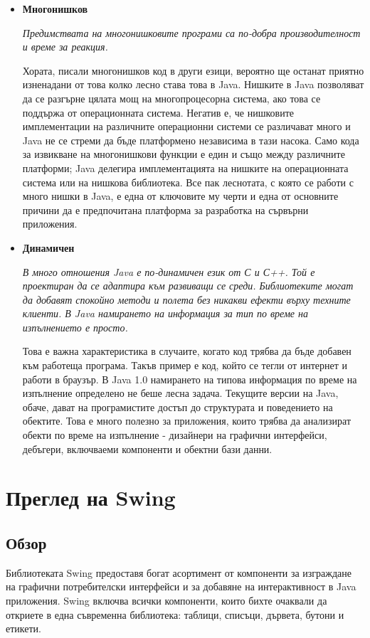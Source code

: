 \begin{itemize}
  \item \textbf{Многонишков}

       \emph{Предимствата на многонишковите програми са по-добра
       производителност и време за реакция.}

       Хората, писали многонишков код в други езици, вероятно ще
       останат приятно изненадани от това колко лесно става това в
       Java. Нишките в Java позволяват да се разгърне цялата мощ на
       многопроцесорна система, ако това се поддържа от операционната
       система. Негатив е, че нишковите имплементации на различните
       операционни системи се различават много и Java не се стреми да
       бъде платформено независима в тази насока. Само кода за
       извикване на многонишкови функции е един и също между
       различните платформи; Java делегира имплементацията на нишките
       на операционната система или на нишкова библиотека. Все пак
       леснотата, с която се работи с много нишки в Java, е една от
       ключовите му черти и една от основните причини да е
       предпочитана платформа за разработка на сървърни приложения.


  \item \textbf{Динамичен}

    \emph{В много отношения Java е по-динамичен език от С и С++. Той е
    проектиран да се адаптира към развиващи се среди. Библиотеките
    могат да добавят спокойно методи и полета без никакви ефекти върху
    техните клиенти. В Java намирането на информация за тип по време
    на изпълнението е просто.}

    Това е важна характеристика в случаите, когато код трябва да бъде
    добавен към работеща програма. Такъв пример е код, който се тегли
    от интернет и работи в браузър. В Java 1.0 намирането на типова
    информация по време на изпълнение определено не беше лесна
    задача. Текущите версии на Java, обаче, дават на програмистите
    достъп до структурата и поведението на обектите. Това е много
    полезно за приложения, които трябва да анализират обекти по време
    на изпълнение - дизайнери на графични интерфейси, дебъгери,
    включваеми компоненти и обектни бази данни.

\end{itemize}
\section{Преглед на Swing}
\subsection{Обзор}
Библиотеката Swing предоставя богат асортимент от компоненти за
изграждане на графични потребителски интерфейси и за добавяне на
интерактивност в Java приложения. Swing включва всички компоненти,
които бихте очаквали да откриете в една съвременна библиотека:
таблици, списъци, дървета, бутони и етикети.

